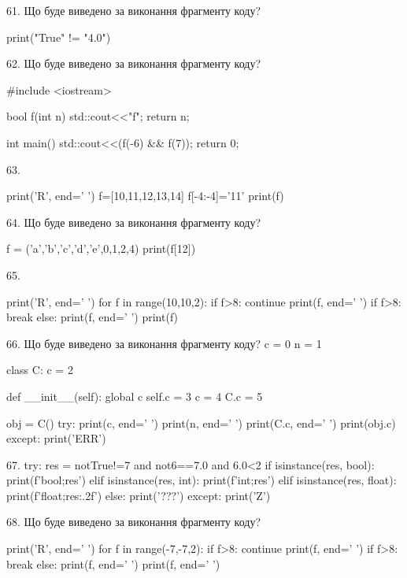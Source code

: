 \documentclass[11pt]{article}
\begin{document}

61. Що буде виведено за виконання фрагменту коду?

print("True" != "4.0")


62. Що буде виведено за виконання фрагменту коду?

#include <iostream>

bool f(int n){
    std::cout<<"f";
    return n;
}

int main(){
    std::cout<<(f(-6) && f(7));
    return 0;
}


63. 

print('R', end=' ')
f=[10,11,12,13,14]
f[-4:-4]='11'
print(f)



64. Що буде виведено за виконання фрагменту коду?

f = ('a','b','c','d','e',0,1,2,4)
print(f[12])



65. 

print('R', end=' ')
for f in range(10,10,2):
    if f>8:
        continue
        print(f, end=' ')
    if f>8:
        break
    else:
        print(f, end=' ')
    print(f)


66. Що буде виведено за виконання фрагменту коду?
c = 0
n = 1

class C:
    c = 2
    
    def __init__(self):
global c        self.c = 3
        c = 4
        C.c = 5

obj = C()
try:
    print(c, end=' ')
    print(n, end=' ')
    print(C.c, end=' ')
    print(obj.c)
except:
    print('ERR')


67. 
try:
    res = notTrue!=7 and not6==7.0 and 6.0<2
    if isinstance(res, bool):
        print(f'bool;{res}')
    elif isinstance(res, int):
        print(f'int;{res}')
    elif isinstance(res, float):
        print(f'float;{res:.2f}')
    else:
        print('???')
except:
    print('Z')


68. Що буде виведено за виконання фрагменту коду?

print('R', end=' ')
for f in range(-7,-7,2):
    if f>8:
        continue
        print(f, end=' ')
    if f>8:
        break
    else:
        print(f, end=' ')
    print(f, end=' ')
\end{document}
